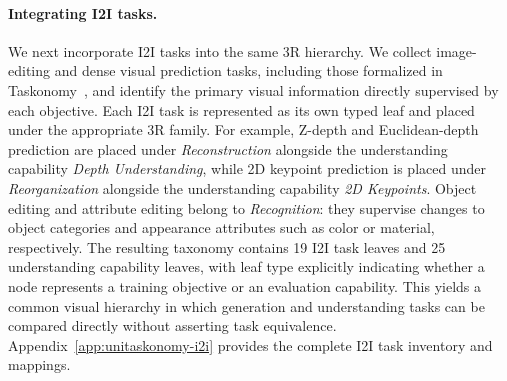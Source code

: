 \paragraph{Integrating I2I tasks.}
We next incorporate I2I tasks into the same 3R hierarchy.
We collect image-editing and dense visual prediction tasks, including those formalized in Taskonomy~\citep{zamir2018taskonomy}, and identify the primary visual information directly supervised by each objective.
Each I2I task is represented as its own typed leaf and placed under the appropriate 3R family.
For example, Z-depth and Euclidean-depth prediction are placed under \textit{Reconstruction} alongside the understanding capability \textit{Depth Understanding}, while 2D keypoint prediction is placed under \textit{Reorganization} alongside the understanding capability \textit{2D Keypoints}.
Object editing and attribute editing belong to \textit{Recognition}: they supervise changes to object categories and appearance attributes such as color or material, respectively.
The resulting taxonomy contains 19 I2I task leaves and 25 understanding capability leaves, with leaf type explicitly indicating whether a node represents a training objective or an evaluation capability.
This yields a common visual hierarchy in which generation and understanding tasks can be compared directly without asserting task equivalence.
Appendix~\ref{app:unitaskonomy-i2i} provides the complete I2I task inventory and mappings.

